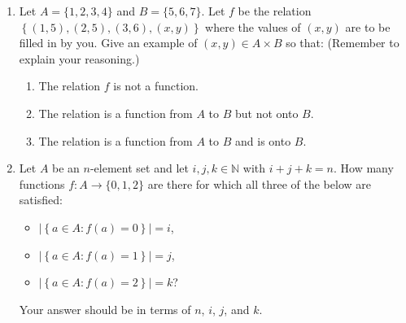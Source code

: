 \documentclass{article}
\theoremstyle{definition}
\begin{document}
\begin{question}{5}
    \begin{enumerate}
        \item Let \(A = \{1,2,3,4\}\) and \(B = \{5,6,7\}\).
        Let \(f\) be the relation \( \left\{(1,5),(2,5),(3,6),(x, y)\right\} \) where the values of $(x, y)$ are to be filled in by you. 
        Give an example of \((x, y) \in A \times B\) so that: (Remember to explain your reasoning.)
            \begin{enumerate}
                \item The relation \(f\) is not a function.
                \item The relation is a function from \(A\) to \(B\) but not onto \(B\).
                \item The relation is a function from \(A\) to \(B\) and is onto \(B\).
            \end{enumerate}

        \item     Let \(A\) be an \(n\)-element set and let \(i, j, k \in \mathbb{N}\) with \(i+j+k = n\).
        How many functions \(f \colon A \to \{0,1,2\}\) are there for which all three of the below are satisfied:
            \begin{itemize}
                \item \(\left|\left\{ a \in A : f(a) = 0 \right\} \right| = i\),
                \item \(\left|\left\{ a \in A : f(a) = 1 \right\} \right| = j\),
                \item \(\left|\left\{ a \in A : f(a) = 2 \right\} \right| = k\)?
            \end{itemize}
            Your answer should be in terms of \(n\), \(i\), \(j\), and \(k\).
    \end{enumerate}
\end{question}
\begin{solution}
\end{solution}
\end{document}

